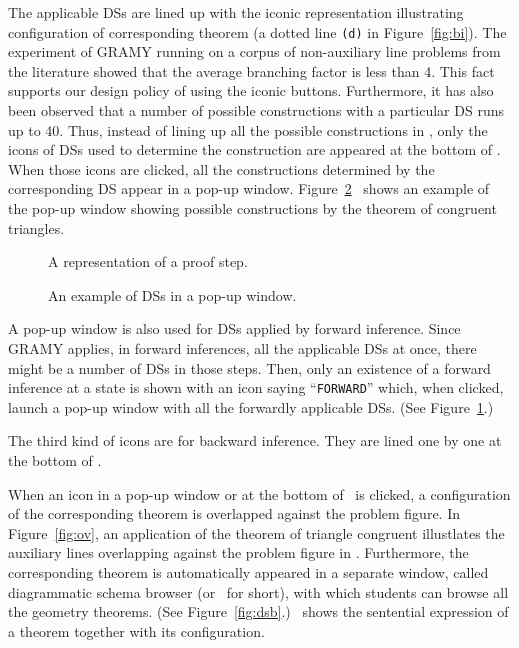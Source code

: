 The applicable DSs are lined up with the iconic representation
illustrating configuration of corresponding theorem (a dotted line
\texttt{(d)} in Figure~\ref{fig:bi}).  The experiment of GRAMY running
on a corpus of non-auxiliary line problems from the literature showed
that the average branching factor is less than 4.  This fact supports
our design policy of using the iconic buttons.  Furthermore, it has also
been observed that a number of possible constructions with a particular
DS runs up to 40.  Thus, instead of lining up all the possible
constructions in \StateView, only the icons of DSs used to determine the
construction are appeared at the bottom of \StateView.  When those icons
are clicked, all the constructions determined by the corresponding DS
appear in a pop-up window.  Figure~\ref{fig:popup}~ shows an example of
the pop-up window showing possible constructions by the theorem of
congruent triangles.

\begin{figure}[tb]
 \center
 \caption{A representation of a proof step.}
 \label{fig:sv}
\end{figure}

\begin{figure}[tb]
 \center
 \caption{An example of DSs in a pop-up window.}
 \label{fig:popup}
\end{figure}

A pop-up window is also used for DSs applied by forward inference.
Since GRAMY applies, in forward inferences, all the applicable DSs at
once, there might be a number of DSs in those steps.  Then, only an
existence of a forward inference at a state is shown with an icon saying
``\texttt{FORWARD}'' which, when clicked, launch a pop-up window with
all the forwardly applicable DSs.  (See Figure~\ref{fig:sv}.)

The third kind of icons are for backward inference.  They are lined one
by one at the bottom of \StateView.

When an icon in a pop-up window or at the bottom of \StateView\ is
clicked, a configuration of the corresponding theorem is overlapped
against the problem figure.  In Figure~\ref{fig:ov}, an application of
the theorem of triangle congruent illustlates the auxiliary lines
overlapping against the problem figure in \StateView.  Furthermore, the
corresponding theorem is automatically appeared in a separate window,
called diagrammatic schema browser (or \DsBrowser\ for short), with
which students can browse all the geometry theorems.  (See
Figure~\ref{fig:dsb}.)  \DsBrowser\ shows the sentential expression of a
theorem together with its configuration.


